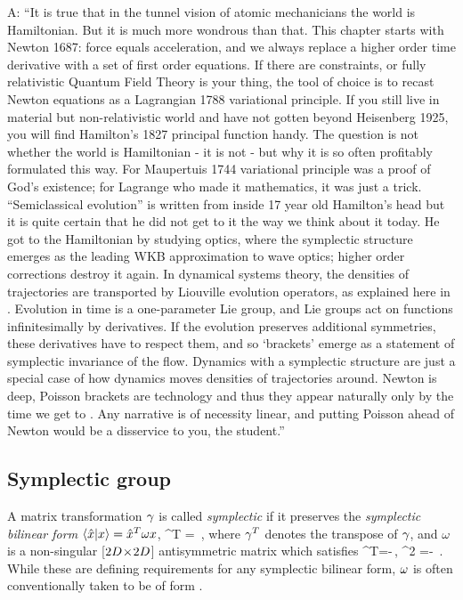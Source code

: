 \noindent
A: ``It is true that in the tunnel vision of atomic mechanicians the
world is Hamiltonian. But it is much more wondrous than that. This
chapter starts with Newton 1687: force equals acceleration, and we always
replace a higher order time derivative with a set of first order
equations. If there are constraints, or fully relativistic Quantum Field
Theory is your thing, the tool of choice is to recast Newton equations as
a Lagrangian 1788 variational principle. If you still live in material
but non-relativistic world and have not gotten beyond Heisenberg 1925,
you will find Hamilton's 1827 principal function handy. The question is
not whether the world is Hamiltonian - it is not - but why it is so often
profitably formulated this way. For Maupertuis 1744 variational principle
was a proof of God's existence; for Lagrange who made it
mathematics, it was just a trick.  ``Semiclassical
evolution''  is written from inside 17 year old Hamilton's head but it is
quite certain that he did not get to it the way we think about it today.
He got to the Hamiltonian by studying optics, where the symplectic
structure emerges as the leading WKB approximation to wave optics; higher
order corrections destroy it again. In dynamical systems theory, the
densities of trajectories are transported by Liouville evolution
operators, as explained here in . Evolution in time
is a one-parameter Lie group, and Lie groups act on functions
infinitesimally by derivatives. If the evolution preserves additional
symmetries, these derivatives have to respect them, and so `brackets'
emerge as a statement of symplectic invariance of the flow. Dynamics with
a symplectic structure are just a special case of how dynamics moves
densities of trajectories around. Newton is deep, Poisson brackets are
technology and thus they appear naturally only by the time we get to
. Any narrative is of necessity linear, and putting
Poisson ahead of Newton would be a disservice  to you, the
student.''


\subsection{Symplectic group}
\label{sect:SymplctGroup}


\noindent
A matrix transformation $\gamma$ is called \emph{symplectic} if it
preserves the \emph{symplectic bilinear form} $\braket{\sspRed}{\pSpace}
= \sspRed^T {\bf \omega} \pSpace$,
\beq
\LieEl^T {\bf \omega} \LieEl = {\bf \omega}
	\,,
where
$\gamma^T$ denotes the transpose of $\gamma$,  and ${\omega}$ is a non-singular
[$2D\!\times\!2D$] antisymmetric matrix which satisfies
\beq
{\bf \omega}^T=-{\bf \omega}\,,
\qquad {\bf \omega}^2 =- \matId
\,.
While these are defining requirements for any {symplectic bilinear form},
${\bf \omega}$ is often conventionally taken to be of form
.



